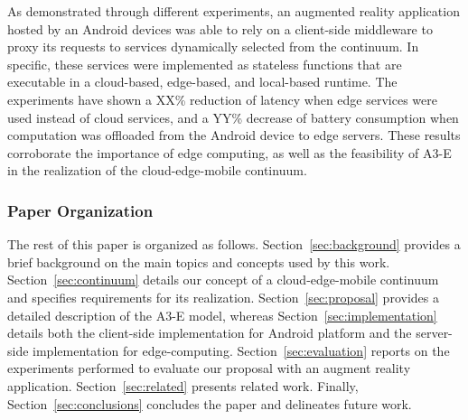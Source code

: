 
As demonstrated through different experiments, an augmented reality application hosted by an Android devices was able to rely on a client-side middleware to proxy its requests to services dynamically selected from the continuum. In specific, these services were implemented as stateless functions that are executable in a cloud-based, edge-based, and local-based runtime. The experiments have shown a XX\% reduction of latency when edge services were used instead of cloud services, and a YY\% decrease of battery consumption when computation was offloaded from the Android device to edge servers. These results corroborate the importance of edge computing, as well as the feasibility of A3-E in the realization of the cloud-edge-mobile continuum.




\subsubsection*{Paper Organization}

The rest of this paper is organized as follows. 
Section~\ref{sec:background} provides a brief background on the main topics and concepts used by this work. Section~\ref{sec:continuum} details our concept of a cloud-edge-mobile continuum and specifies requirements for its realization. Section~\ref{sec:proposal} provides a detailed description of the A3-E model, whereas Section~\ref{sec:implementation} details both the client-side implementation for Android platform and the server-side implementation for edge-computing. Section~\ref{sec:evaluation} reports on the experiments performed to evaluate our proposal with an augment reality application. Section~\ref{sec:related} presents related work. Finally, Section~\ref{sec:conclusions} concludes the paper and delineates future work.




